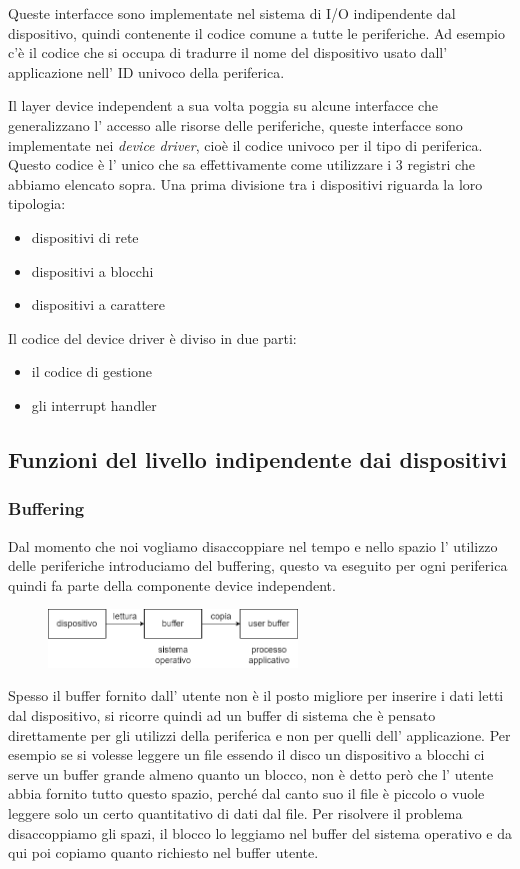 Queste interfacce sono implementate nel sistema di I/O indipendente dal dispositivo, quindi contenente il codice comune a tutte le periferiche.
Ad esempio c'è il codice che si occupa di tradurre il nome del dispositivo usato dall' applicazione nell' ID univoco della periferica.

Il layer device independent a sua volta poggia su alcune interfacce che generalizzano l' accesso alle risorse delle periferiche, queste interfacce sono implementate nei \emph{device driver}, cioè il codice univoco per il tipo di periferica.
Questo codice è l' unico che sa effettivamente come utilizzare i 3 registri che abbiamo elencato sopra.
Una prima divisione tra i dispositivi riguarda la loro tipologia:
\begin{itemize}
    \item dispositivi di rete
    \item dispositivi a blocchi
    \item dispositivi a carattere
\end{itemize}
Il codice del device driver è diviso in due parti:
\begin{itemize}
    \item il codice di gestione
    \item gli interrupt handler
\end{itemize}

\subsection{Funzioni del livello indipendente dai dispositivi}
\subsubsection{Buffering}
Dal momento che noi vogliamo disaccoppiare nel tempo e nello spazio l' utilizzo delle periferiche introduciamo del buffering, questo va eseguito per ogni periferica quindi fa parte della componente device independent.
\begin{figure}[H]
    \centering
    \includegraphics[width=250px]{images/10_Gestione_delle_periferiche/buffering.png}
\end{figure}
Spesso il buffer fornito dall' utente non è il posto migliore per inserire i dati letti dal dispositivo, si ricorre quindi ad un buffer di sistema che è pensato direttamente per gli utilizzi della periferica e non per quelli dell' applicazione.
Per esempio se si volesse leggere un file essendo il disco un dispositivo a blocchi ci serve un buffer grande almeno quanto un blocco, non è detto però che l' utente abbia fornito tutto questo spazio, perché dal canto suo il file è piccolo o vuole leggere solo un certo quantitativo di dati dal file.
Per risolvere il problema disaccoppiamo gli spazi, il blocco lo leggiamo nel buffer del sistema operativo e da qui poi copiamo quanto richiesto nel buffer utente.

